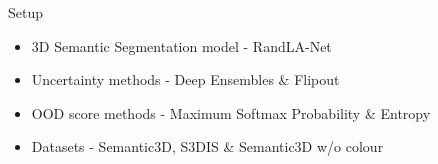 \documentclass[aspectratio=169]{beamer}
\begin{document}
\begin{frame}[noframenumbering]{Setup}
    \begin{itemize}
        \item 3D Semantic Segmentation model - RandLA-Net
        \item Uncertainty methods - Deep Ensembles \& Flipout
        \item OOD score methods - Maximum Softmax Probability \& Entropy
        \item Datasets - Semantic3D, S3DIS \& Semantic3D w/o colour
    \end{itemize}
\end{frame}
\end{document}
